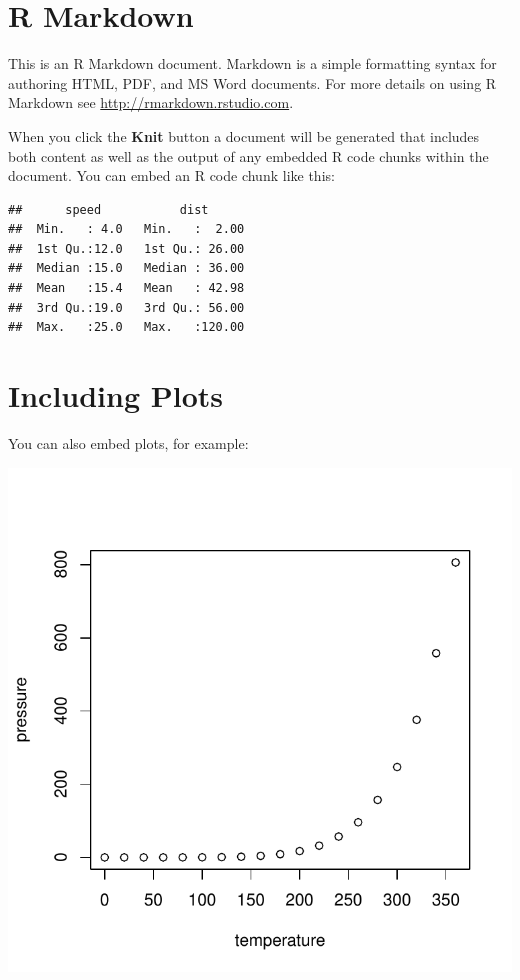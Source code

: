 \documentclass[12pt,english, french, spanish, brazil,a4paper,twoside, openright]{abntex2}	%
\begin{document}
\hypertarget{r-markdown}{%
\section{R Markdown}\label{r-markdown}}

This is an R Markdown document. Markdown is a simple formatting syntax
for authoring HTML, PDF, and MS Word documents. For more details on
using R Markdown see \url{http://rmarkdown.rstudio.com}.

When you click the \textbf{Knit} button a document will be generated
that includes both content as well as the output of any embedded R code
chunks within the document. You can embed an R code chunk like this:

\begin{verbatim}
##      speed           dist       
##  Min.   : 4.0   Min.   :  2.00  
##  1st Qu.:12.0   1st Qu.: 26.00  
##  Median :15.0   Median : 36.00  
##  Mean   :15.4   Mean   : 42.98  
##  3rd Qu.:19.0   3rd Qu.: 56.00  
##  Max.   :25.0   Max.   :120.00
\end{verbatim}

\hypertarget{including-plots}{%
\section{Including Plots}\label{including-plots}}

You can also embed plots, for example:

\begin{center}\includegraphics{Monografia_files/figure-latex/pressure-1} \end{center}
\end{document}
